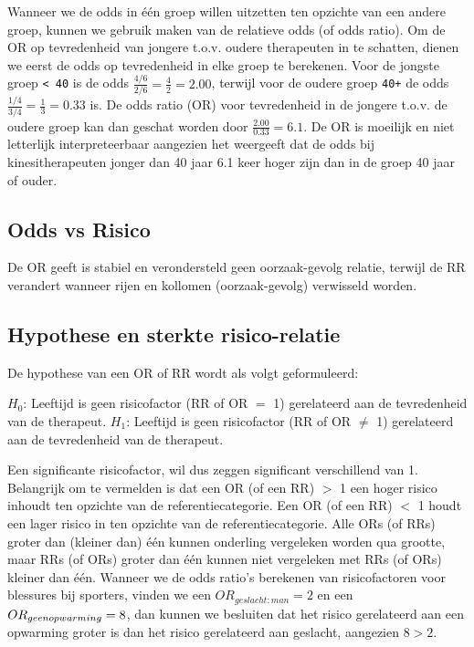 \documentclass[
]{book}
\theoremstyle{definition}
\theoremstyle{definition}
\theoremstyle{definition}
\theoremstyle{definition}
\theoremstyle{remark}
\begin{document}
Wanneer we de odds in één groep willen uitzetten ten opzichte van een andere groep, kunnen we gebruik maken van de relatieve odds (of odds ratio). Om de OR op tevredenheid van jongere t.o.v. oudere therapeuten in te schatten, dienen we eerst de odds op tevredenheid in elke groep te berekenen. Voor de jongste groep \texttt{\textless{}\ 40} is de odds \(\frac{4/6}{2/6} = \frac{4}{2} = 2.00\), terwijl voor de oudere groep \texttt{40+} de odds \(\frac{1/4}{3/4} = \frac{1}{3} = 0.33\) is. De odds ratio (OR) voor tevredenheid in de jongere t.o.v. de oudere groep kan dan geschat worden door \(\frac{2.00}{0.33} = 6.1\). De OR is moeilijk en niet letterlijk interpreteerbaar aangezien het weergeeft dat de odds bij kinesitherapeuten jonger dan 40 jaar 6.1 keer hoger zijn dan in de groep 40 jaar of ouder.

\hypertarget{odds-vs-risico}{%
\subsection*{Odds vs Risico}\label{odds-vs-risico}}


De OR geeft is stabiel en verondersteld geen oorzaak-gevolg relatie, terwijl de RR verandert wanneer rijen en kollomen (oorzaak-gevolg) verwisseld worden.

\hypertarget{hypothese-en-sterkte-risico-relatie}{%
\subsection*{Hypothese en sterkte risico-relatie}\label{hypothese-en-sterkte-risico-relatie}}


De hypothese van een OR of RR wordt als volgt geformuleerd:

\(H_0\): Leeftijd is geen risicofactor (RR of OR \(=\) 1) gerelateerd aan de tevredenheid van de therapeut. \(H_1\): Leeftijd is geen risicofactor (RR of OR \(\neq\) 1) gerelateerd aan de tevredenheid van de therapeut.

Een significante risicofactor, wil dus zeggen significant verschillend van 1. Belangrijk om te vermelden is dat een OR (of een RR) \(>\) 1 een hoger risico inhoudt ten opzichte van de referentiecategorie. Een OR (of een RR) \(<\) 1 houdt een lager risico in ten opzichte van de referentiecategorie. Alle ORs (of RRs) groter dan (kleiner dan) één kunnen onderling vergeleken worden qua grootte, maar RRs (of ORs) groter dan één kunnen niet vergeleken met RRs (of ORs) kleiner dan één. Wanneer we de odds ratio's berekenen van risicofactoren voor blessures bij sporters, vinden we een \(OR_{geslacht:man} = 2\) en een \(OR_{geen \space opwarming} = 8\), dan kunnen we besluiten dat het risico gerelateerd aan een opwarming groter is dan het risico gerelateerd aan geslacht, aangezien \(8 > 2\).
\end{document}

